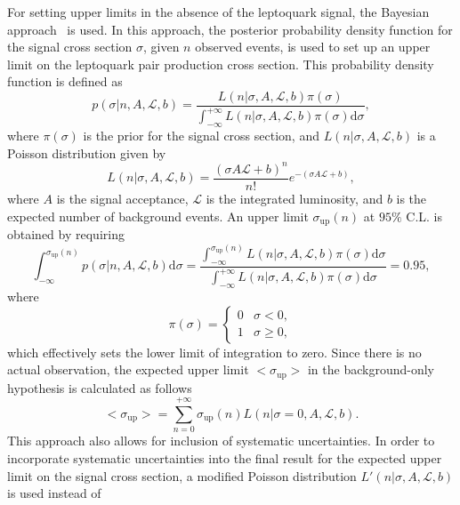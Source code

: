 For setting upper limits in the absence of the leptoquark signal, the Bayesian approach~\cite{Amsler:2008zzb} is used. In this approach, the
posterior probability density function for the signal cross section $\sigma$, given $n$ observed events, is used to set up an upper limit 
on the leptoquark pair production cross section. This probability density function is defined as 
\begin{equation}
p(\sigma|n,A,\mathcal{L},b)=\frac{L(n|\sigma,A,\mathcal{L},b)\pi(\sigma)}{\int_{-\infty}^{+\infty}L(n|\sigma,A,\mathcal{L},b)\pi(\sigma)\mathrm{d}\sigma},
\end{equation}
where $\pi(\sigma)$ is the prior for the signal cross section, and $L(n|\sigma,A,\mathcal{L},b)$ is a Poisson distribution given by
\begin{equation}
L(n|\sigma,A,\mathcal{L},b)=\frac{(\sigma A\mathcal{L}+b)^n}{n!}e^{-(\sigma A\mathcal{L}+b)},
\end{equation}
where $A$ is the signal acceptance, $\mathcal{L}$ is the integrated luminosity, and $b$ is the expected number of background events.
An upper limit $\sigma_\text{up}(n)$ at $95\%$ C.L. is obtained by requiring
\begin{equation}
\int_{-\infty}^{\sigma_\text{up}(n)}p(\sigma|n,A,\mathcal{L},b)\mathrm{d}\sigma=\frac{\int_{-\infty}^{\sigma_\text{up}(n)}L(n|\sigma,A,\mathcal{L},b)\pi(\sigma)\mathrm{d}\sigma}{\int_{-\infty}^{+\infty}L(n|\sigma,A,\mathcal{L},b)\pi(\sigma)\mathrm{d}\sigma}=0.95, 
\label{eq:xs_up}
\end{equation}
where
\begin{equation}
\pi(\sigma)=\begin{cases}
          0&  \sigma<0,\\
          1&  \sigma\geq 0,
\end{cases}
\end{equation}
which effectively sets the lower limit of integration to zero. Since there is no actual observation, the expected 
upper limit $\mathrm{<}\sigma_\text{up}\mathrm{>}$ in the background-only hypothesis is calculated as follows
\begin{equation}
\mathrm{<}\sigma_\text{up}\mathrm{>}=\sum_{n=0}^{+\infty} \sigma_\text{up}(n)L(n|\sigma=0,A,\mathcal{L},b).
\end{equation}
This approach also allows for inclusion of systematic uncertainties. In order to incorporate systematic uncertainties into the final
result for the expected upper limit on the signal cross section, a modified Poisson distribution $L'(n|\sigma,A,\mathcal{L},b)$ is used instead of
